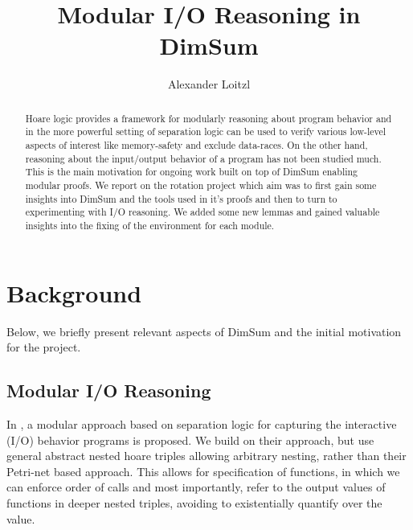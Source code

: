 \documentclass[runningheads, orivec]{llncs}
\begin{document}
\title{Modular I/O Reasoning in DimSum}
%
%
\author{Alexander Loitzl\Envelope{}}%
%

%
\maketitle              %
%
%

\begin{abstract}
  Hoare logic provides a framework for modularly reasoning about program behavior and in the more powerful setting of separation logic can be used to verify various low-level aspects of interest like memory-safety and exclude data-races. On the other hand, reasoning about the input/output behavior of a program has not been studied much.
  This is the main motivation for ongoing work built on top of DimSum enabling modular proofs.
  We report on the rotation project which aim was to first gain some insights into DimSum and the tools used in it's proofs and then to turn to experimenting with I/O reasoning.
  We added some new lemmas and gained valuable insights into the fixing of the environment for each module.
\end{abstract}

\section{Background}
Below, we briefly present relevant aspects of DimSum\cite{dimsum} and the initial motivation for the project.
\subsection{Modular I/O Reasoning}

In \cite{io1,io2},  a modular approach based on separation logic for capturing the interactive (I/O) behavior programs is proposed. We build on their approach, but use general abstract nested hoare triples allowing arbitrary nesting, rather than their Petri-net based approach. This allows for specification of functions, in which we can enforce order of calls and most importantly, refer to the output values of functions in deeper nested triples, avoiding to existentially quantify over the value.
\end{document}
